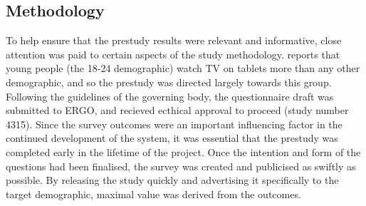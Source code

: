 
\subsection{Methodology}




To help ensure that the prestudy results were relevant and informative, close attention was paid to certain aspects of the study methodology.
\citet{viacom} reports that young people (the 18-24 demographic) watch TV on tablets more than any other demographic, and so the prestudy was directed largely towards this group. %
Following the guidelines of the governing body, the questionnaire draft was submitted to ERGO, and recieved ecthical approval to proceed (study number 4315). %
Since the survey outcomes were an important influencing factor in the continued development of the system, it was essential that the prestudy was completed early in the lifetime of the project. Once the intention and form of the questions had been finalised, the survey was created and publicised as swiftly as possible.
By releasing the study quickly and advertising it specifically to the target demographic, maximal value was derived from the outcomes. %


